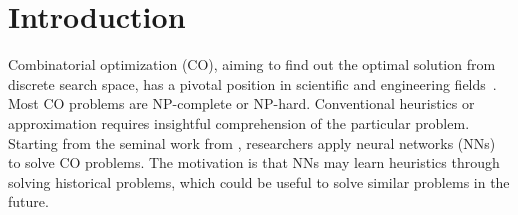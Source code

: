 
\section{Introduction} \label{sec:intro}
Combinatorial optimization (CO), aiming to find out the optimal solution from discrete search space, has a pivotal position in scientific and engineering fields~\citep{papadimitriou1998combinatorial,crama1997combinatorial}. Most CO problems are NP-complete or NP-hard. Conventional heuristics or approximation requires insightful comprehension of the particular problem. Starting from the seminal work from \cite{hopfield1985neural}, researchers apply neural networks (NNs)~\citep{smith1999neural, vinyals2015pointer} to solve CO problems. The motivation is that NNs may learn heuristics through solving historical problems, which could be useful to solve similar problems in the future. %


